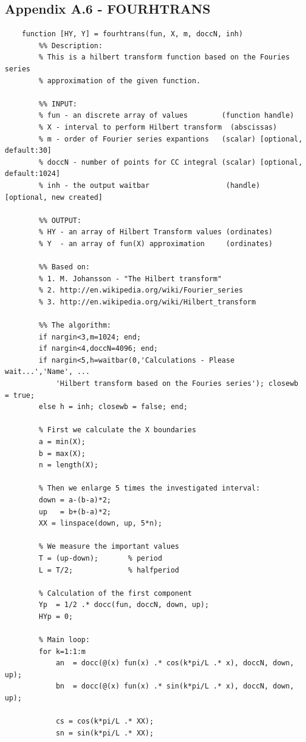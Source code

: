 \documentclass[12pt,twoside,a4paper]{article}
\numberwithin{equation}{subsection}
\numberwithin{figure}{subsection}
\begin{document}
\subsection*{Appendix A.6 - FOURHTRANS}
\begin{lstlisting}
	function [HY, Y] = fourhtrans(fun, X, m, doccN, inh)
	    %% Description: 
	    % This is a hilbert transform function based on the Fouries series
	    % approximation of the given function.
	    
	    %% INPUT:
	    % fun - an discrete array of values        (function handle)
	    % X - interval to perform Hilbert transform  (abscissas)
	    % m - order of Fourier series expantions   (scalar) [optional, default:30]
	    % doccN - number of points for CC integral (scalar) [optional, default:1024]
	    % inh - the output waitbar                  (handle) [optional, new created]
	    
	    %% OUTPUT:
	    % HY - an array of Hilbert Transform values (ordinates)
	    % Y  - an array of fun(X) approximation     (ordinates)
	    
	    %% Based on:
	    % 1. M. Johansson - "The Hilbert transform"
	    % 2. http://en.wikipedia.org/wiki/Fourier_series
	    % 3. http://en.wikipedia.org/wiki/Hilbert_transform
	    
	    %% The algorithm:
	    if nargin<3,m=1024; end;
	    if nargin<4,doccN=4096; end;
	    if nargin<5,h=waitbar(0,'Calculations - Please wait...','Name', ...
	    	'Hilbert transform based on the Fouries series'); closewb = true;
	    else h = inh; closewb = false; end;
	
	    % First we calculate the X boundaries
	    a = min(X);       
	    b = max(X);
	    n = length(X);
	
	    % Then we enlarge 5 times the investigated interval:
	    down = a-(b-a)*2; 
	    up   = b+(b-a)*2;
	    XX = linspace(down, up, 5*n);
	
	    % We measure the important values
	    T = (up-down);       % period
	    L = T/2;             % halfperiod
	
	    % Calculation of the first component
	    Yp  = 1/2 .* docc(fun, doccN, down, up);
	    HYp = 0;
	
	    % Main loop:
	    for k=1:1:m
	        an  = docc(@(x) fun(x) .* cos(k*pi/L .* x), doccN, down, up);
	        bn  = docc(@(x) fun(x) .* sin(k*pi/L .* x), doccN, down, up);
	
	        cs = cos(k*pi/L .* XX);
	        sn = sin(k*pi/L .* XX);
	        

\end{lstlisting}
\end{document}
